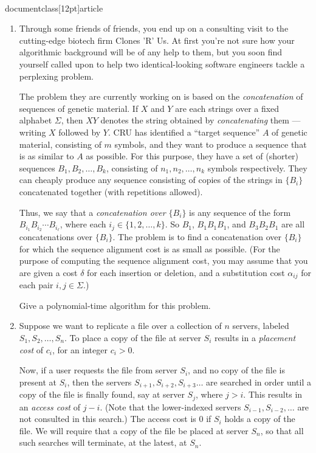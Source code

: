 \\documentclass[12pt]{article}
\begin{document}
\begin{enumerate}

\item

Through some friends of friends, you end up 
on a consulting visit to the cutting-edge
biotech firm Clones 'R' Us.
At first you're not sure how your algorithmic background
will be of any help to them, but you soon find yourself
called upon to help two identical-looking software engineers
tackle a perplexing problem.

The problem they are currently working on is based on
the {\em concatenation} of sequences of genetic material.
If $X$ and $Y$ are each strings over a fixed alphabet $\Sigma$,
then $XY$ denotes the string obtained by {\em concatenating} them ---
writing $X$ followed by $Y$.
CRU has identified a ``target sequence''
$A$ of genetic material, consisting of $m$ symbols,
and they want to produce a sequence that is as similar to $A$ as possible.
For this purpose, they have a set of (shorter) sequences
$B_1, B_2, \ldots, B_k$, consisting of $n_1, n_2, \ldots, n_k$
symbols respectively.
They can cheaply produce any sequence consisting of copies
of the strings in $\{B_i\}$ concatenated together (with repetitions allowed).

Thus, we say that a {\em concatenation over $\{B_i\}$} is any
sequence of the form $B_{i_1} B_{i_2} \cdots B_{i_\ell}$,
where each $i_j \in \{1, 2, \ldots, k\}$.
So $B_1$, $B_1 B_1 B_1$, and $B_3 B_2 B_1$ are all
concatenations over $\{B_i\}$.
The problem is to find a concatenation over $\{B_i\}$
for which the sequence alignment cost is as small as possible.
(For the purpose of computing the sequence alignment cost, you may
assume that you are given a cost $\delta$ for each insertion
or deletion, and a substitution cost $\alpha_{ij}$ 
for each pair $i, j \in \Sigma$.)

Give a polynomial-time algorithm for this problem.


\item

Suppose we want to replicate a file over a collection of
$n$ servers, labeled $S_1, S_2, \ldots, S_n$.  To place a copy
of the file at server $S_i$ results in a {\em placement cost} of $c_i$,
for an integer $c_i > 0$.

Now, if a user requests the file from server $S_i$, and no
copy of the file is present at $S_i$, then the servers $S_{i+1},
S_{i+2}, S_{i+3} \ldots$ are searched in order until a copy of the file
is finally found, say at server $S_j$, where $j > i$.
This results in an {\em access cost} of $j - i$.
(Note that the lower-indexed servers $S_{i-1}, S_{i-2}, \ldots$
are not consulted in this search.)
The access cost is $0$ if $S_i$ holds a copy of the file.
We will require that a copy of the file be placed at server $S_n$,
so that all such searches will terminate, at the latest, at $S_n$.


\end{enumerate}
\end{document}
